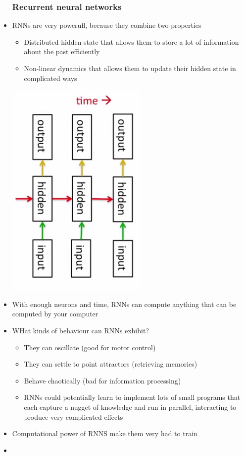 \begin{itemize}
	\subsubsection{Recurrent neural networks}
	\item RNNs are very powerufl, because they combine two properties
	\begin{itemize}
		\item Distributed hidden state that allows them to store a lot of information about the past efficiently
		\item Non-linear dynamics that allows them to update their hidden state in complicated ways
	\end{itemize}
	\begin{center}
		\includegraphics[scale=0.7]{sections/7/rnn.png}
	\end{center}
	\item With enough neurons and time, RNNs can compute anything that can be computed by your computer
	\item WHat kinds of behaviour can RNNs exhibit?
	\begin{itemize}
		\item They can oscillate (good for motor control)
		\item They can settle to point attractors (retrieving memories)
		\item Behave chaotically (bad for information processing)
		\item RNNs could potentially learn to implement lots of small programs that each capture a nugget of knowledge and run in parallel, interacting to produce very complicated effects
	\end{itemize}
	\item Computational power of RNNS make them very had to train
	\item 



\end{itemize}
